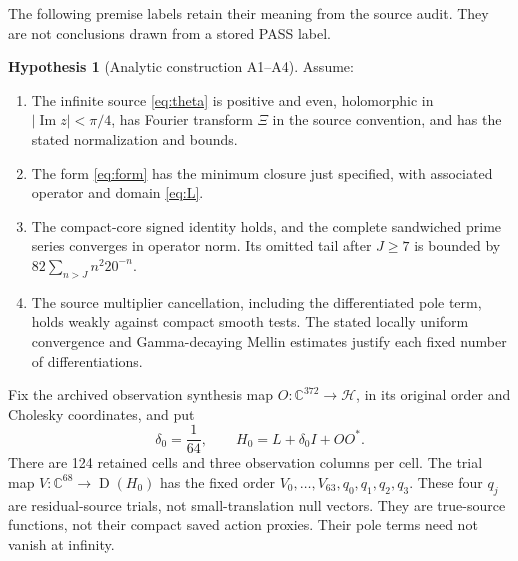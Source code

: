 \documentclass[11pt,a4paper]{article}
\newcommand{\C}{\mathbb C}
\newcommand{\HH}{\mathcal H}
\newcommand{\Id}{I}
\newcommand{\Dom}{\operatorname{D}}
\theoremstyle{definition}
\newtheorem{hypothesis}[theorem]{Hypothesis}
\theoremstyle{remark}
\numberwithin{equation}{section}
\begin{document}
The following premise labels retain their meaning from the source audit.
They are not conclusions drawn from a stored PASS label.

\begin{hypothesis}[Analytic construction A1--A4]\label{hyp:A}
Assume:
\begin{enumerate}
\item[(A1)] The infinite source \eqref{eq:theta} is positive and even,
holomorphic in \(|\operatorname{Im}z|<\pi/4\), has Fourier transform
\(\Xi\) in the source convention, and has the stated normalization and bounds.
\item[(A2)] The form \eqref{eq:form} has the minimum closure just specified,
with associated operator and domain \eqref{eq:L}.
\item[(A3)] The compact-core signed identity holds, and the complete
sandwiched prime series converges in operator norm. Its omitted tail
after \(J\ge7\) is bounded by \(82\sum_{n>J}n^2 20^{-n}\).
\item[(A4)] The source multiplier cancellation, including the differentiated
pole term, holds weakly against compact smooth tests. The stated locally
uniform convergence and Gamma-decaying Mellin estimates justify each
fixed number of differentiations.
\end{enumerate}
\end{hypothesis}

Fix the archived observation synthesis map \(O:\C^{372}\to\HH\), in its
original order and Cholesky coordinates, and put
\begin{equation}\label{eq:H0}
 \delta_0=\frac1{64},\qquad H_0=L+\delta_0\Id+OO^*.
\end{equation}
There are 124 retained cells and three observation columns per cell.
The trial map \(V:\C^{68}\to\Dom(H_0)\) has the fixed order
\(V_0,\ldots,V_{63},q_0,q_1,q_2,q_3\).
These four \(q_j\) are residual-source trials, not small-translation
null vectors. They are true-source functions, not their compact saved
action proxies. Their pole terms need not vanish at infinity.
\end{document}
